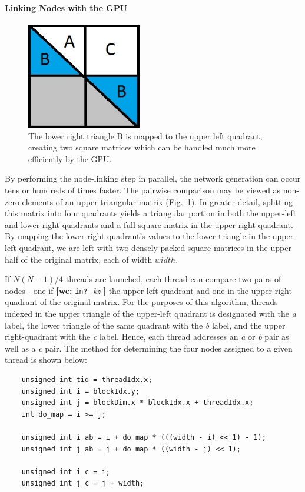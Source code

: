 \documentclass[preprint,notitlepage,amsmath,amssymb,floatfix]{revtex4-1}
\newcommand{\XXX}[3]{{\bf [#1: } {\tt #3} {\it -#2-}{\bf ]}}
\begin{document}
\paragraph{Linking Nodes with the GPU}

\begin{figure}
\includegraphics[width=5cm]{figures/Matrix_Map.jpg}
\caption{The lower right triangle B is mapped to the upper left quadrant, creating two square matrices which can be handled much more efficiently by the GPU.}
\label{fig:matrix_map}
\centering
\end{figure}

By performing the node-linking step in parallel, the network generation can occur tens or hundreds of times faster.
The pairwise comparison may be viewed as non-zero elements of an upper triangular matrix (Fig.~\ref{fig:matrix_map}).
In greater detail, splitting this matrix into four quadrants yields a triangular portion in both the upper-left and lower-right quadrants and a full square matrix in the upper-right quadrant.
By mapping the lower-right quadrant's values to the lower triangle in the upper-left quadrant, we are left with two densely packed square matrices in the upper half of the original matrix, each of width $width$. \par
If $N(N-1)/4$ threads are launched, each thread can compare two pairs of nodes - one if \XXX{wc}{kz}{in?} the upper left quadrant and one in the upper-right quadrant of the original matrix.
For the purposes of this algorithm, threads indexed in the upper triangle of the upper-left quadrant is designated with the \textit{a} label, the lower triangle of the same quadrant with the \textit{b} label, and the upper right-quadrant with the \textit{c} label.  
Hence, each thread addresses an \textit{a} or \textit{b} pair as well as a \textit{c} pair.  
The method for determining the four nodes assigned to a given thread is shown below:

\begin{lstlisting}
	unsigned int tid = threadIdx.x;
	unsigned int i = blockIdx.y;
	unsigned int j = blockDim.x * blockIdx.x + threadIdx.x;
	int do_map = i >= j;

	unsigned int i_ab = i + do_map * (((width - i) << 1) - 1);
	unsigned int j_ab = j + do_map * ((width - j) << 1);

	unsigned int i_c = i;
	unsigned int j_c = j + width;
\end{lstlisting}
\end{document}
